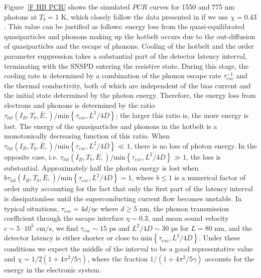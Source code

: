 \documentclass[%
reprint,
 amsmath,amssymb,
aps,
pra,
]{revtex4-1}
\begin{document}
\quad Figure~\ref{F HB PCR} shows the simulated \(PCR\) curves for 1550 and 775 nm photons at \(T_b=1\) K, which closely follow the data presented in \cite{korzh_demonstrating_2018} if we use \(\chi=0.43\). This value can be justified as follows: energy loss from the quasi-equilibrated quasiparticles and phonons making up the hotbelt occurs due to the out-diffusion of quasiparticles and the escape of phonons. Cooling of the hotbelt and the order parameter suppression takes a substantial part of the detector latency interval, terminating with the SNSPD entering the resistive state. During this stage, the cooling rate is determined by a combination of the phonon escape rate \(\tau_{esc}^{-1}\) and the thermal conductivity, both of which are independent of the bias current and the initial state determined by the photon energy. Therefore, the energy loss from electrons and phonons is determined by the ratio \(\tau_{lat}\left(I_B,T_b,\bar{E},\right)/\text{min}\left\lbrace \tau_{esc},L^2/4D \right\rbrace\); the larger this ratio is, the more energy is lost.  The energy of the quasiparticles and phonons in the hotbelt is a monotonically decreasing function of this ratio. When \(\tau_{lat}\left(I_B,T_b,\bar{E},\right)/\text{min}\left\lbrace \tau_{esc},L^2/4D \right\rbrace \ll 1\), there is no loss of photon energy. In the opposite case, i.e. \(\tau_{lat}\left(I_B,T_b,\bar{E},\right)/\text{min}\left\lbrace \tau_{esc},L^2/4D \right\rbrace \gg 1\), the loss is substantial.  Approximately half the photon energy is lost when \(b\tau_{lat}\left(I_B,T_b,\bar{E},\right)/\text{min}\left\lbrace \tau_{esc},L^2/4D \right\rbrace = 1\), where \(b \leq 1\) is a numerical factor of order unity accounting for the fact that only the first part of the latency interval is dissipationless until the superconducting current flow becomes unstable.  In typical situations, \(\tau_{esc}=4d/\eta c\) \cite{kaplan_acoustic_1979} where \(d\geq 5 \text{ nm}\), the phonon transmission coefficient through the escape interface \(\eta \sim 0.3\), and mean sound velocity \(c \sim 5 \cdot 10^5 \text{ cm/s}\), we find \(\tau_{esc} \sim 15 \text{ ps}\) and \(L^2/4D \sim 30 \text{ ps} \) for \(L=80 \text{ nm}\), and the detector latency is either shorter or close to  \(\text{min}\left\lbrace \tau_{esc},L^2/4D \right\rbrace\).  Under these conditions we expect the middle of the interval to be a good representative value and \(\chi=1/2\left(1 + 4\pi^2/5\gamma\right)\), where the fraction \(1/\left(1 + 4\pi^2/5\gamma\right)\) accounts for the energy in the electronic system.
\end{document}
